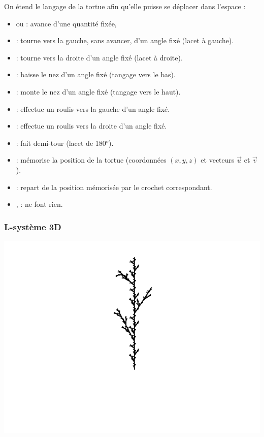 \documentclass[11pt,class=report,crop=false]{standalone}
\begin{document}
On étend le langage de la tortue afin qu'elle puisse se déplacer dans l'espace :
  \begin{itemize}
  \item {} ou  : avance d'une quantité fixée,
  \item \mot{+} : tourne vers la gauche, sans avancer, d'un angle fixé (lacet à gauche).
  \item \mot{-} : tourne vers la droite d'un angle fixé (lacet à droite).
  \item \mot{\&} : baisse le nez d'un angle fixé (tangage vers le bas).
  \item \mot{\textasciicircum} : monte le nez d'un angle fixé (tangage vers le haut).
  \item \mot{<} : effectue un roulis vers la gauche d'un angle fixé.
  \item \mot{>} : effectue un roulis vers la droite d'un angle fixé.
  \item \mot{|} : fait demi-tour (lacet de \ang{180}).
  \item \mot{[} : mémorise la position de la tortue (coordonnées $(x,y,z)$ et vecteurs $\vec{u}$ et $\vec{v}$).
  \item \mot{]} : repart de la position mémorisée par le crochet \mot{[} correspondant.
  \item {},  : ne font rien. 
\end{itemize}
 

\subsubsection*{L-système 3D}

\begin{center}
\includegraphics[scale=\myscale,scale=0.6]{figures/plante-01-0}
\end{center}
\end{document}

